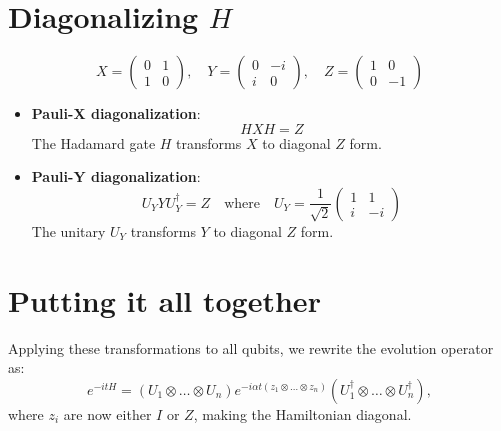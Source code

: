\documentclass{article}
\begin{document}
\section{Diagonalizing $H$}

\begin{equation}
X = \begin{pmatrix} 0 & 1 \\ 1 & 0 \end{pmatrix}, \quad
Y = \begin{pmatrix} 0 & -i \\ i & 0 \end{pmatrix}, \quad
Z = \begin{pmatrix} 1 & 0 \\ 0 & -1 \end{pmatrix}
\end{equation}

\begin{itemize}

    \item \textbf{Pauli-X diagonalization}:
    \begin{equation}
    HXH = Z
    \end{equation}
    The Hadamard gate $H$ transforms $X$ to diagonal $Z$ form.

    \item \textbf{Pauli-Y diagonalization}:
    \begin{equation}
    U_Y Y U_Y^\dagger = Z \quad \text{where} \quad U_Y = \frac{1}{\sqrt{2}}\begin{pmatrix} 1 & 1 \\ i & -i \end{pmatrix}
    \end{equation}
    The unitary $U_Y$ transforms $Y$ to diagonal $Z$ form.
  \end{itemize}


  \section{Putting it all together}

Applying these transformations to all qubits, we rewrite the evolution operator as:
\begin{equation}
  e^{-itH} = (U_1 \otimes \dots \otimes U_n) e^{-i\alpha t (z_1 \otimes \dots \otimes z_n)} (U_1^\dagger \otimes \dots \otimes U_n^\dagger),
\end{equation}
where $z_i$ are now either $I$ or $Z$, making the Hamiltonian diagonal.
\end{document}
